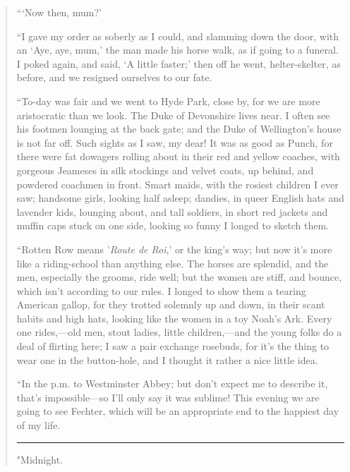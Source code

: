 \begin{quote}
```Now then, mum?'

``I gave my order as soberly as I could, and slamming down the door, with
an `Aye, aye, mum,' the man made his
horse walk, as if going to a funeral. I poked again, and said,
`A little faster;' then off he went,
helter-skelter, as before, and we resigned ourselves to our fate.

``To-day was fair and we went to Hyde Park, close by, for we are more
aristocratic than we look. The Duke of Devonshire lives near. I often
see his footmen lounging at the back gate; and the Duke of
Wellington's house is not far off. Such sights as I saw,
my dear! It was as good as Punch, for there were fat dowagers rolling
about in their red and yellow coaches, with gorgeous Jeameses in silk
stockings and velvet coats, up behind, and powdered coachmen in front.
Smart maids, with the rosiest children I ever saw; handsome girls,
looking half asleep; dandies, in queer English hats and lavender kids,
lounging about, and tall soldiers, in short red jackets and muffin caps
stuck on one side, looking so funny I longed to sketch them.

``Rotten Row means '\emph{Route de
Roi},' or the king's way; but now
it's more like a riding-school than anything else. The
horses are splendid, and the men, especially the grooms, ride well; but
the women are stiff, and bounce, which isn't according
to our rules. I longed to show them a tearing American gallop, for they
trotted solemnly up and down, in their scant habits and high hats,
looking like the women in a toy Noah's Ark. Every one
rides,---old men, stout ladies, little children,---and the young folks
do a deal of flirting here; I saw a pair exchange rosebuds, for
it's the thing to wear one in the button-hole, and I
thought it rather a nice little idea.

``In the {p.m.} to Westminster Abbey; but don't expect me
to describe it, that's impossible---so
I'll only say it was sublime! This evening we are going
to see Fechter, which will be an appropriate end to the happiest day of
my life.

\begin{center}\rule{0.5\linewidth}{0.5pt}\end{center}

"{Midnight.}


\end{quote}
